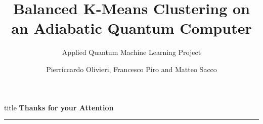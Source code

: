 

\title{\Large \textbf{Balanced K-Means Clustering on an Adiabatic Quantum Computer}}
\subtitle{Applied Quantum Machine Learning Project}



\author{Pierriccardo Olivieri, Francesco Piro and Matteo Sacco}


	
{
	\frame{\titlepage}
}


\clearpage


\clearpage


\clearpage


\begin{frame}[plain]
	\vfill
	\centering
	\begin{beamercolorbox}[sep=8pt,center,shadow=true,rounded=true]{title}
		\textbf{Thanks for your Attention}\par%
		\color{polimiblue}\noindent\rule{10cm}{1pt} \\
	\end{beamercolorbox}
	\vfill
\end{frame}





